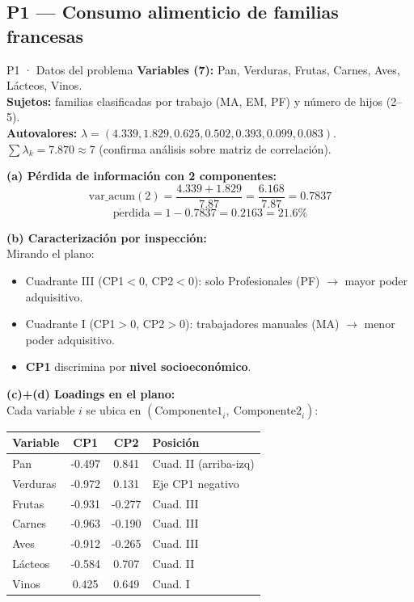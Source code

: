\documentclass[11pt,a4paper]{article}
\begin{document}
\subsection{P1 — Consumo alimenticio de familias francesas}

\begin{ejerciciobox}{P1 · Datos del problema}
\textbf{Variables (7):} Pan, Verduras, Frutas, Carnes, Aves, Lácteos, Vinos.\\
\textbf{Sujetos:} familias clasificadas por trabajo (MA, EM, PF) y número de hijos (2--5).\\
\textbf{Autovalores:} $\lambda = (4.339, 1.829, 0.625, 0.502, 0.393, 0.099, 0.083)$.\\
$\sum \lambda_k = 7.870 \approx 7$ (confirma análisis sobre matriz de correlación).
\end{ejerciciobox}

\textbf{(a) Pérdida de información con 2 componentes:}
\[
\mathrm{var\_acum}(2) = \frac{4.339 + 1.829}{7.87} = \frac{6.168}{7.87} = 0.7837
\]
\[
\boxed{\;\mathrm{p\acute{e}rdida} = 1 - 0.7837 = 0.2163 = 21.6\%\;}
\]

\textbf{(b) Caracterización por inspección:}\\
Mirando el plano:
\begin{itemize}[leftmargin=*]
    \item Cuadrante III (CP1$<$0, CP2$<$0): solo Profesionales (PF) $\to$ mayor poder adquisitivo.
    \item Cuadrante I (CP1$>$0, CP2$>$0): trabajadores manuales (MA) $\to$ menor poder adquisitivo.
    \item \textbf{CP1} discrimina por \textbf{nivel socioeconómico}.
\end{itemize}

\textbf{(c)+(d) Loadings en el plano:}\\
Cada variable $i$ se ubica en $(\mathrm{Componente1}_i,\ \mathrm{Componente2}_i)$:
\begin{center}\small
\begin{tabular}{lcc|l}
\toprule
Variable & CP1 & CP2 & Posición \\
\midrule
Pan      & -0.497 & 0.841  & Cuad. II (arriba-izq) \\
Verduras & -0.972 & 0.131  & Eje CP1 negativo \\
Frutas   & -0.931 & -0.277 & Cuad. III \\
Carnes   & -0.963 & -0.190 & Cuad. III \\
Aves     & -0.912 & -0.265 & Cuad. III \\
Lácteos  & -0.584 & 0.707  & Cuad. II \\
Vinos    & 0.425  & 0.649  & Cuad. I \\
\bottomrule
\end{tabular}
\end{center}
\end{document}
